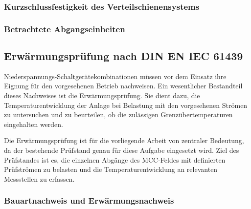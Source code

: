 
\subsubsection{Kurzschlussfestigkeit des Verteilschienensystems}
\label{sec:kurzschlussfestigkeit}


\subsubsection{Betrachtete Abgangseinheiten}
\label{sec:betrachtete_abgaenge}

\subsection{Erwärmungsprüfung nach DIN EN IEC 61439}
\label{sec:normen_61439}

Niederspannungs-Schaltgerätekombinationen müssen vor dem Einsatz ihre Eignung für den vorgesehenen Betrieb nachweisen. Ein wesentlicher Bestandteil dieses Nachweises ist die Erwärmungsprüfung. Sie dient dazu, die Temperaturentwicklung der Anlage bei Belastung mit den vorgesehenen Strömen zu untersuchen und zu beurteilen, ob die zulässigen Grenzübertemperaturen eingehalten werden.

Die Erwärmungsprüfung ist für die vorliegende Arbeit von zentraler Bedeutung, da der bestehende Prüfstand genau für diese Aufgabe eingesetzt wird. Ziel des Prüfstandes ist es, die einzelnen Abgänge des MCC-Feldes mit definierten Prüfströmen zu belasten und die Temperaturentwicklung an relevanten Messstellen zu erfassen.

\subsubsection{Bauartnachweis und Erwärmungsnachweis}
\label{sec:bauartnachweis_erwaermungsnachweis}


